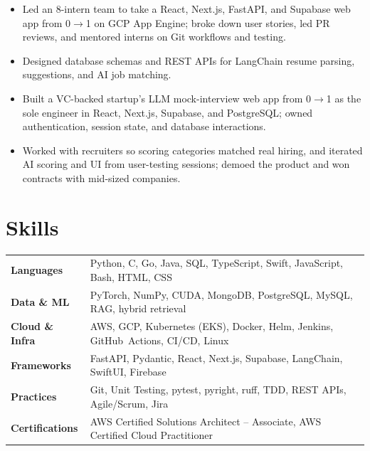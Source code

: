\documentclass[11pt, letterpaper]{article}
\begin{document}
\vspace{1pt}
\begin{itemize}
  \item Led an 8-intern team to take a React, Next.js, FastAPI, and Supabase web app from 0$\to$1 on GCP App Engine; broke down user stories, led PR reviews, and mentored interns on Git workflows and testing.
  \item Designed database schemas and REST APIs for LangChain resume parsing, suggestions, and AI job matching.
\end{itemize}

\vspace{1pt}
\begin{itemize}
  \item Built a VC-backed startup's LLM mock-interview web app from 0$\to$1 as the sole engineer in React, Next.js, Supabase, and PostgreSQL; owned authentication, session state, and database interactions.
  \item Worked with recruiters so scoring categories matched real hiring, and iterated AI scoring and UI from user-testing sessions; demoed the product and won contracts with mid-sized companies.
\end{itemize}

\section{Skills}
\begin{tabularx}{\textwidth}{@{}l @{\hspace{7pt}} >{\raggedright\arraybackslash}X@{}}
  \textbf{Languages} & Python, C, Go, Java, SQL, TypeScript, Swift, JavaScript, Bash, HTML, CSS \\[1pt]
  \textbf{Data \& ML} & PyTorch, NumPy, CUDA, MongoDB, PostgreSQL, MySQL, RAG, hybrid retrieval \\[1pt]
  \textbf{Cloud \& Infra} & AWS, GCP, Kubernetes (EKS), Docker, Helm, Jenkins, GitHub~Actions, CI/CD, Linux \\[1pt]
  \textbf{Frameworks} & FastAPI, Pydantic, React, Next.js, Supabase, LangChain, SwiftUI, Firebase \\[1pt]
  \textbf{Practices} & Git, Unit Testing, pytest, pyright, ruff, TDD, REST APIs, Agile/Scrum, Jira \\[1pt]
  \textbf{Certifications} & AWS Certified Solutions Architect -- Associate, AWS Certified Cloud Practitioner \\
\end{tabularx}
\end{document}
